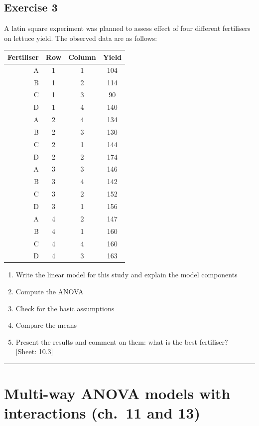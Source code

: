 \documentclass[a4paper,12pt,oneside]{book}
\providecommand{\tightlist}{%
  \setlength{\itemsep}{0pt}\setlength{\parskip}{0pt}}
\begin{document}
\hypertarget{exercise-3-6}{%
\subsection{Exercise 3}\label{exercise-3-6}}

A latin square experiment was planned to assess effect of four different fertilisers on lettuce yield. The observed data are as follows:

\begin{longtable}[]{@{}rccc@{}}
\toprule
Fertiliser & Row & Column & Yield \\
\midrule
\endhead
A & 1 & 1 & 104 \\
B & 1 & 2 & 114 \\
C & 1 & 3 & 90 \\
D & 1 & 4 & 140 \\
A & 2 & 4 & 134 \\
B & 2 & 3 & 130 \\
C & 2 & 1 & 144 \\
D & 2 & 2 & 174 \\
A & 3 & 3 & 146 \\
B & 3 & 4 & 142 \\
C & 3 & 2 & 152 \\
D & 3 & 1 & 156 \\
A & 4 & 2 & 147 \\
B & 4 & 1 & 160 \\
C & 4 & 4 & 160 \\
D & 4 & 3 & 163 \\
\bottomrule
\end{longtable}

\begin{enumerate}
\def\labelenumi{\arabic{enumi}.}
\tightlist
\item
  Write the linear model for this study and explain the model components
\item
  Compute the ANOVA
\item
  Check for the basic assumptions
\item
  Compare the means
\item
  Present the results and comment on them: what is the best fertiliser?\\
  {[}Sheet: 10.3{]}
\end{enumerate}

\begin{center}\rule{0.5\linewidth}{0.5pt}\end{center}

\hypertarget{multi-way-anova-models-with-interactions-ch.-11-and-13}{%
\section{Multi-way ANOVA models with interactions (ch.~11 and 13)}\label{multi-way-anova-models-with-interactions-ch.-11-and-13}}
\end{document}
